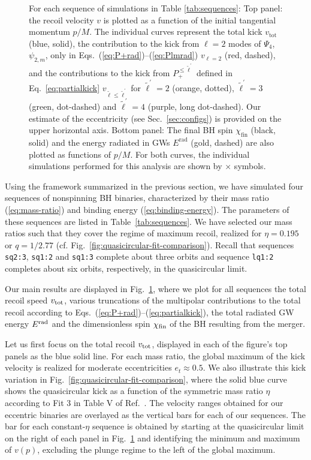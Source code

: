 \documentclass[floats,floatfix,showpacs,amssymb,physrev,twocolumn,superscriptaddress,reprint,
nofootinbib, longbibliography]{revtex4-2}
\newcommand{\rad}{\mathrm{rad}}
\begin{document}
\begin{figure}[t]
{    }
    \caption{For each sequence of simulations in Table \ref{tab:sequences}:
    Top panel: the recoil velocity $v$ is plotted as a function 
    of the initial tangential momentum $p/M$. The individual curves 
    represent the total kick $v_\mathrm{tot}$ (blue, solid), the 
    contribution to the kick from $\ell=2$ modes of $\Psi_4$, $\psi_{2,m}$, 
    only in Eqs.~(\ref{eq:P+rad})--(\ref{eq:Plmrad}) $v_{\ell=2}$ 
    (red, dashed), and the contributions to the kick from 
    $P_+^{\leq \tilde{\ell}^\prime}$ defined in Eq.~\eqref{eq:partialkick}
    $v_{\tilde{\ell}\leq\tilde{\ell}^\prime} $ for $\tilde{\ell}^\prime=2$ 
    (orange, dotted), $\tilde{\ell}^\prime=3$ (green, dot-dashed) 
    and $\tilde{\ell}^\prime=4$ (purple, long dot-dashed). 
    Our estimate of the eccentricity (see Sec.~\ref{sec:configs}) is 
    provided on the upper horizontal axis.
    Bottom panel: The final BH spin $\chi_{\mathrm{fin}}$ 
    (black, solid) and the energy radiated in GWs $E^\rad$ (gold, dashed) 
    are also plotted as functions of $p/M$. For both curves, the 
    individual simulations performed for this analysis are shown by 
    $\times$ symbols.}
    \label{fig:kicks2}
\end{figure}
%
Using the framework summarized in the previous section,
we have simulated four sequences of nonspinning BH binaries,
characterized by their mass ratio (\ref{eq:mass-ratio})
and binding energy (\ref{eq:binding-energy}).
The parameters of these sequences are listed in Table~\ref{tab:sequences}.
We have selected our mass ratios such that they cover the
regime of maximum recoil, realized for $\eta=0.195$ or
$q=1/2.77$ (cf. Fig.~\ref{fig:quasicircular-fit-comparison}).
Recall that sequences \texttt{sq2:3}, \texttt{sq1:2} and \texttt{sq1:3}
complete about three orbits and sequence \texttt{lq1:2} completes
about six orbits, respectively, in the quasicircular limit.

Our main results are displayed in Fig.~\ref{fig:kicks2}, where we plot
for all sequences the total recoil speed $v_{\rm tot}$, various
truncations of the multipolar contributions to the total recoil
according to Eqs.~(\ref{eq:P+rad})--(\ref{eq:partialkick}), the
total radiated GW energy $E^{\rm rad}$ and the dimensionless spin
$\chi_{\rm fin}$ of the BH resulting from the merger.

Let us first focus on the total recoil $v_{\rm tot}$, displayed in each
of the figure's top panels as the blue solid line.  For each mass
ratio, the global maximum of the kick velocity is realized for
moderate eccentricities
$e_t\approx 0.5$.
We also illustrate this kick variation in
Fig.~\ref{fig:quasicircular-fit-comparison}, where
the solid blue curve shows the
quasicircular kick as a function
of the symmetric mass ratio $\eta$ according to
Fit 3 in Table V of Ref.~\cite{Healy:2017mvh}. The velocity ranges
obtained for our eccentric binaries are
overlayed as the vertical bars for each of our sequences.
The bar for each constant-$\eta$ sequence
is obtained by starting at the quasicircular limit on the 
right of each panel in Fig.~\ref{fig:kicks2} and identifying
the minimum and maximum of $v(p)$, excluding the 
plunge regime to the left of the global maximum.
\end{document}
